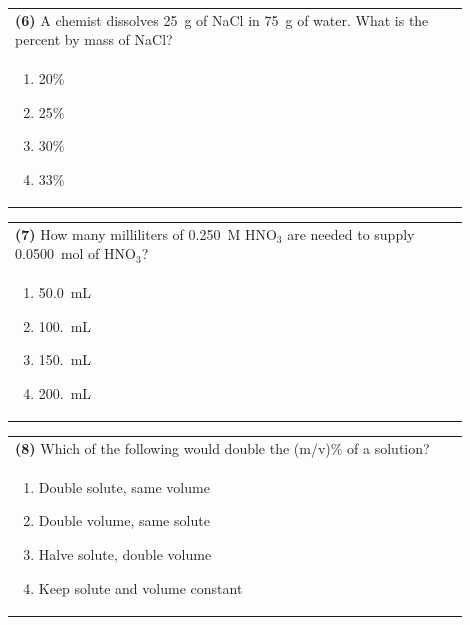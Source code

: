 \documentclass{article}
\begin{document}
\noindent\begin{tabular}{|p{0.9\linewidth}|}
\hline
\textbf{(6)} A chemist dissolves 25~g of NaCl in 75~g of water. What is the percent by mass of NaCl?\\[0.2cm]
\begin{minipage}[t]{0.85\linewidth}
\begin{enumerate}[label=\alph*.]
\item 20\%
\item 25\%
\item 30\%
\item 33\%
\end{enumerate}
\end{minipage}\\[0.2cm]
\hline
\end{tabular}

\noindent\begin{tabular}{|p{0.9\linewidth}|}
\hline
\textbf{(7)} How many milliliters of 0.250~M HNO$_3$ are needed to supply 0.0500~mol of HNO$_3$?\\[0.2cm]
\begin{minipage}[t]{0.85\linewidth}
\begin{enumerate}[label=\alph*.]
\item 50.0~mL
\item 100.~mL
\item 150.~mL
\item 200.~mL
\end{enumerate}
\end{minipage}\\[0.2cm]
\hline
\end{tabular}

\noindent\begin{tabular}{|p{0.9\linewidth}|}
\hline
\textbf{(8)} Which of the following would double the (m/v)\% of a solution?\\[0.2cm]
\begin{minipage}[t]{0.85\linewidth}
\begin{enumerate}[label=\alph*.]
\item Double solute, same volume
\item Double volume, same solute
\item Halve solute, double volume
\item Keep solute and volume constant
\end{enumerate}
\end{minipage}\\[0.2cm]
\hline
\end{tabular}
\newpage
\end{document}
